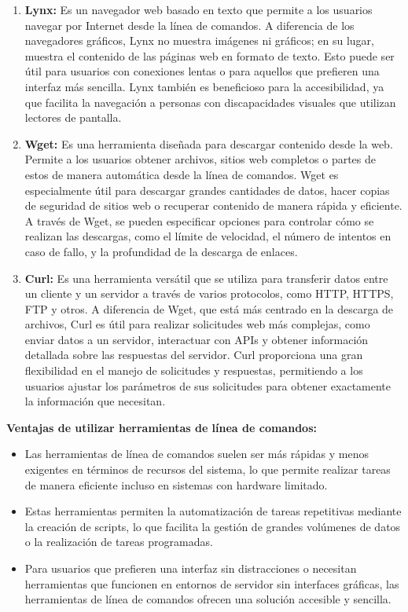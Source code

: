\documentclass[12pt]{article}
\begin{document}
                        \begin{enumerate}
                                \item \textbf{Lynx:} Es un navegador web basado en texto que permite a los usuarios navegar por Internet desde la línea de comandos. A diferencia de los navegadores gráficos, Lynx no muestra imágenes ni gráficos; en su lugar, muestra el contenido de las páginas web en formato de texto. Esto puede ser útil para usuarios con conexiones lentas o para aquellos que prefieren una interfaz más sencilla. Lynx también es beneficioso para la accesibilidad, ya que facilita la navegación a personas con discapacidades visuales que utilizan lectores de pantalla.
                                \item \textbf{Wget:} Es una herramienta diseñada para descargar contenido desde la web. Permite a los usuarios obtener archivos, sitios web completos o partes de estos de manera automática desde la línea de comandos. Wget es especialmente útil para descargar grandes cantidades de datos, hacer copias de seguridad de sitios web o recuperar contenido de manera rápida y eficiente. A través de Wget, se pueden especificar opciones para controlar cómo se realizan las descargas, como el límite de velocidad, el número de intentos en caso de fallo, y la profundidad de la descarga de enlaces.
                                \item \textbf{Curl:} Es una herramienta versátil que se utiliza para transferir datos entre un cliente y un servidor a través de varios protocolos, como HTTP, HTTPS, FTP y otros. A diferencia de Wget, que está más centrado en la descarga de archivos, Curl es útil para realizar solicitudes web más complejas, como enviar datos a un servidor, interactuar con APIs y obtener información detallada sobre las respuestas del servidor. Curl proporciona una gran flexibilidad en el manejo de solicitudes y respuestas, permitiendo a los usuarios ajustar los parámetros de sus solicitudes para obtener exactamente la información que necesitan.
                        \end{enumerate}

                        \textbf{Ventajas de utilizar herramientas de línea de comandos:}

                        \begin{itemize}
                                \item Las herramientas de línea de comandos suelen ser más rápidas y menos exigentes en términos de recursos del sistema, lo que permite realizar tareas de manera eficiente incluso en sistemas con hardware limitado.
                                \item Estas herramientas permiten la automatización de tareas repetitivas mediante la creación de scripts, lo que facilita la gestión de grandes volúmenes de datos o la realización de tareas programadas.
                                \item Para usuarios que prefieren una interfaz sin distracciones o necesitan herramientas que funcionen en entornos de servidor sin interfaces gráficas, las herramientas de línea de comandos ofrecen una solución accesible y sencilla.
                        \end{itemize}
\end{document}
